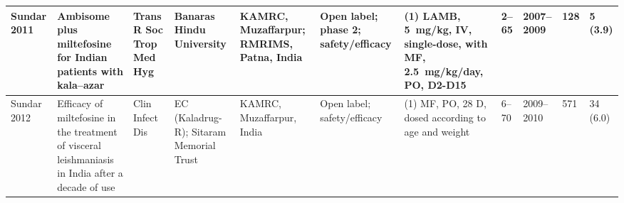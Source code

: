\begin{ThreePartTable}
\begin{longtable}[c]{L{1.5cm} L{3.5cm} L{1.3cm} L{2.5cm} L{2.5cm} L{2.5cm} L{3cm} L{1.5cm} L{1cm} L{1cm} L{1.3cm}}
    Sundar 2011\cite{sundar2006prot,sundar2011}     & Ambisome plus miltefosine for Indian patients with kala--azar                                                                                                                                                               & Trans R Soc Trop Med Hyg & Banaras Hindu University                                                             & KAMRC, Muzaffarpur; RMRIMS, Patna, India          & Open label; phase 2; safety/efficacy                                               & (1) LAMB, 5~mg/kg, IV, single-dose, with MF, 2.5~mg/kg/day, PO, D2-D15                                                                                                                                       & 2--65       & 2007--2009   & 128          & 5 (3.9)                                                                                                                                                                                                                                                                                                                                                                                                                                                                                                                                                                                        \\ \midrule
    Sundar 2012\cite{sundar2012}                    & Efficacy of miltefosine in the treatment of visceral leishmaniasis in India after a decade of use                                                                                                                           & Clin Infect Dis          & EC (Kaladrug-R); Sitaram Memorial Trust                                              & KAMRC, Muzaffarpur, India                         & Open label; safety/efficacy                                                        & (1) MF, PO, 28 D, dosed according to age and weight                                                                                                                                                       & 6--70       & 2009--2010   & 571          & 34 (6.0)                                                                                                                                                                                                                                                                                                                                                                                                                                                                                                                                                                                       \\ \midrule

\end{longtable}
\end{ThreePartTable}
